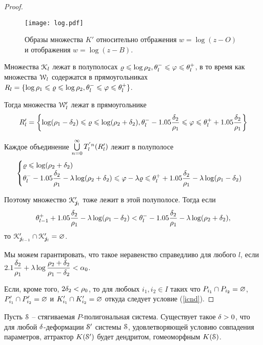 \begin{proof}
\begin{figure}[H]
    \centering
    \texttt{[image: log.pdf]}
    \caption{Образы множества $K'$ относительно отбражения $w=\log(z-O)$ и отображения $w=\log(z-B)$.}
    \label{img:log}
\end{figure}

Множества ${\EuScript K}_l$ лежат в полуполосах $ \varrho\leqslant \log\rho_2, \theta^-_l\leqslant\varphi\leqslant\theta^+_l$, в то время как множества ${\EuScript W}_l$ содержатся в прямоугольниках $R_l=\{\log\rho_1 \leqslant\varrho\leqslant \log\rho_2, \theta^-_l\leqslant\varphi\leqslant\theta^+_l\}$.

Тогда множества ${\EuScript W}'_l$ лежат в прямоугольнике 
\begin{equation} 
R'_l=\left\{\log(\rho_1-\delta_2)\leqslant\varrho\leqslant \log(\rho_2+\delta_2), \theta^-_l-1.05\dfrac{\delta_2}{\rho_1}\leqslant\varphi\leqslant\theta^+_l+1.05\dfrac{\delta_2}{\rho_1}\right\}
\end{equation}

Каждое объединение  $\bigcup\limits_{n=0}^\infty T^{'n}_l(R'_l)$ лежит в полуполосе 
\begin{equation} 
\begin{cases}
\varrho\leqslant \log(\rho_2+\delta_2)\\   
\theta^-_l-1.05\dfrac{\delta_2}{\rho_1}-\lambda \log(\rho_2+\delta_2)\leqslant\varphi-\lambda\varrho\leqslant \theta^+_l+1.05\dfrac{\delta_2}{\rho_1}-\lambda \log(\rho_1-\delta_2)
\end{cases}
\end{equation}

Поэтому множество ${\EuScript K}'_{{\bm{j}}_l}$ тоже лежит в этой полуполосе.
Тогда если 
\begin{equation}
\theta^+_{l-1}+1.05\dfrac{\delta_2}{\rho_1}-\lambda \log(\rho_1-\delta_2)<\theta^-_l-1.05\dfrac{\delta_2}{\rho_1}-\lambda \log(\rho_2+\delta_2),
\end{equation} 
то ${\EuScript K}'_{{\bm{j}}_{l-1}}\cap{\EuScript K}'_{{\bm{j}}_l}=\varnothing$.

Мы можем гарантировать, что такое неравенство справедливо для любого $l$, если 
$2.1\dfrac{\delta_2}{\rho_1}+\lambda\log\dfrac{\rho_2+\delta_2}{\rho_1-\delta_2}<\alpha_0$.

Если, кроме того, $2\delta_2<\rho_0$, то для любоых $i_1,i_2\in I$  таких что $P_{i_1}\cap P_{i_2}=\varnothing$, $P'_{i_1}\cap P'_{i_2}=\varnothing$  и $K'_{i_1}\cap K'_{i_2}=\varnothing$ откуда следует условие (\ref{icnd}).
\end{proof}
 
 
\begin{theorem}\label{mainthm}
Пусть ${\EuScript S}$ -- стягиваемая $P$-полигональная система. Существует такое $\delta>0$, что для любой $\delta$-деформации ${\EuScript S}'$ системы ${\EuScript S}$, удовлетворяющей условию совпадения параметров, аттрактор $K({\EuScript S}')$ будет дендритом, гомеоморфным $K({\EuScript S})$.
\end{theorem}

